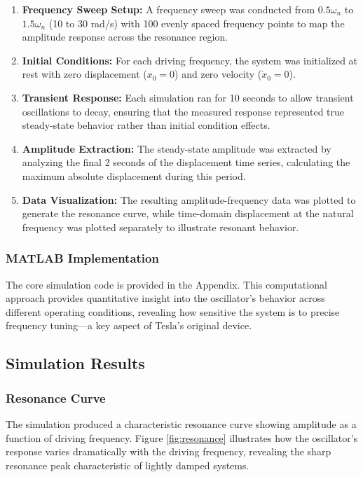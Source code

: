 \documentclass[12pt,a4paper]{article}
\begin{document}
\begin{enumerate}
\item \textbf{Frequency Sweep Setup:} A frequency sweep was conducted from $0.5\omega_n$ to $1.5\omega_n$ (10 to 30 rad/s) with 100 evenly spaced frequency points to map the amplitude response across the resonance region.

\item \textbf{Initial Conditions:} For each driving frequency, the system was initialized at rest with zero displacement ($x_0 = 0$) and zero velocity ($\dot{x}_0 = 0$).

\item \textbf{Transient Response:} Each simulation ran for 10 seconds to allow transient oscillations to decay, ensuring that the measured response represented true steady-state behavior rather than initial condition effects.

\item \textbf{Amplitude Extraction:} The steady-state amplitude was extracted by analyzing the final 2 seconds of the displacement time series, calculating the maximum absolute displacement during this period.

\item \textbf{Data Visualization:} The resulting amplitude-frequency data was plotted to generate the resonance curve, while time-domain displacement at the natural frequency was plotted separately to illustrate resonant behavior.
\end{enumerate}

\subsubsection*{MATLAB Implementation}
The core simulation code is provided in the Appendix. This computational approach provides quantitative insight into the oscillator's behavior across different operating conditions, revealing how sensitive the system is to precise frequency tuning---a key aspect of Tesla's original device.

\subsection*{Simulation Results}

\subsubsection*{Resonance Curve}
The simulation produced a characteristic resonance curve showing amplitude as a function of driving frequency. Figure \ref{fig:resonance} illustrates how the oscillator's response varies dramatically with the driving frequency, revealing the sharp resonance peak characteristic of lightly damped systems.
\end{document}
